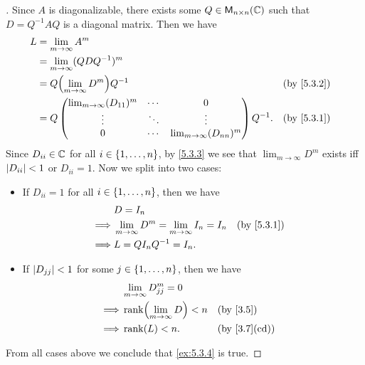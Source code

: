 \begin{proof}[]
	Since \(A\) is diagonalizable, there exists some \(Q \in \mathsf{M}_{{n} \times n}({\mathbb{C}})\) such that \(D = Q^{-1} A Q\) is a diagonal matrix.
	Then we have
	\begin{align*}
		L & = \lim_{m \to \infty} A^m                                                                     \\
		  & = \lim_{m \to \infty} (Q D Q^{-1})^m                                                          \\
		  & = Q \pa{\lim_{m \to \infty} D^m} Q^{-1}                                       &  & \by{5.3.2} \\
		  & = Q \begin{pmatrix}
			        \lim_{m \to \infty} (D_{1 1})^m & \cdots & 0                               \\
			        \vdots                          & \ddots & \vdots                          \\
			        0                               & \cdots & \lim_{m \to \infty} (D_{n n})^m
		        \end{pmatrix} Q^{-1}. &  & \by{5.3.1}                \\
	\end{align*}
	Since \(D_{i i} \in \mathbb{C}\) for all \(i \in \left\lbrace1, \dots, n\right\rbrace\), by \cref{5.3.3} we see that \(\lim_{m \to \infty} D^m\) exists iff \(\left\lvert D_{i i}\right\rvert < 1\) or \(D_{i i} = 1\).
	Now we split into two cases:
	\begin{itemize}
		\item If \(D_{i i} = 1\) for all \(i \in \left\lbrace1, \dots, n\right\rbrace\), then we have
		      \begin{align*}
			               & D = I_n                                                                 \\
			      \implies & \lim_{m \to \infty} D^m = \lim_{m \to \infty} I_n = I_n &  & \by{5.3.1} \\
			      \implies & L = Q I_n Q^{-1} = I_n.
		      \end{align*}
		\item If \(\left\lvert D_{j j}\right\rvert < 1\) for some \(j \in \left\lbrace1, \dots, n\right\rbrace\), then we have
		      \begin{align*}
			               & \lim_{m \to \infty} D_{j j}^m = 0                   \\
			      \implies & \rk{\lim_{m \to \infty} D} < n    &  & \by{3.5}     \\
			      \implies & \rk{L} < n.                       &  & \by{3.7}[cd]
		      \end{align*}
	\end{itemize}
	From all cases above we conclude that \cref{ex:5.3.4} is true.
\end{proof}

